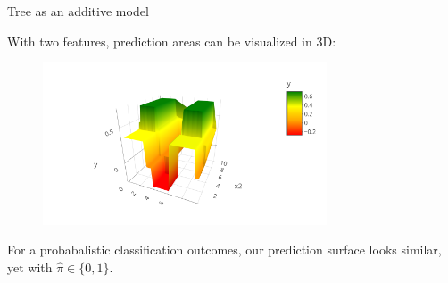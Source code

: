 \documentclass[11pt,compress,t,notes=noshow, xcolor=table]{beamer}
\begin{document}
\begin{vbframe}{Tree as an additive model}

With two features, prediction areas can be visualized in 3D:
\lz
\begin{figure} 
\includegraphics[width=0.75\textwidth, keepaspectratio]{figure_man/tree-contin-surface3d.png}
\end{figure}

For a probabalistic classification outcomes, our prediction surface looks similar, yet with $\hat{\pi} \in \{0,1\}$. 

\end{vbframe}










\endlecture
\end{document}
